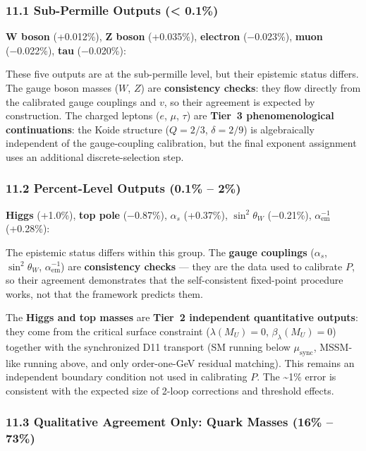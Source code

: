 \subsubsection{11.1 Sub-Permille Outputs (\textless{} 0.1\%)}\label{111-sub-permille-outputs--01}

\textbf{W boson} (+0.012\%), \textbf{Z boson} (+0.035\%), \textbf{electron} (−0.023\%), \textbf{muon} (−0.022\%), \textbf{tau} (−0.020\%):

These five outputs are at the sub-permille level, but their epistemic status differs. The gauge boson masses (\(W\), \(Z\)) are \textbf{consistency checks}: they flow directly from the calibrated gauge couplings and \(v\), so their agreement is expected by construction. The charged leptons (\(e\), \(\mu\), \(\tau\)) are \textbf{Tier~3 phenomenological continuations}: the Koide structure (\(Q = 2/3\), \(\delta = 2/9\)) is algebraically independent of the gauge-coupling calibration, but the final exponent assignment uses an additional discrete-selection step.

\subsubsection{11.2 Percent-Level Outputs (0.1\% -- 2\%)}\label{112-percent-level-outputs-01--2}

\textbf{Higgs} (+1.0\%), \textbf{top pole} (−0.87\%), \textbf{\(\alpha_s\)} (+0.37\%), \textbf{\(\sin^2\theta_W\)} (−0.21\%), \textbf{\(\alpha_{\text{em}}^{-1}\)} (+0.28\%):

The epistemic status differs within this group. The \textbf{gauge couplings} (\(\alpha_s\), \(\sin^2\theta_W\), \(\alpha_{\text{em}}^{-1}\)) are \textbf{consistency checks} --- they are the data used to calibrate \(P\), so their agreement demonstrates that the self-consistent fixed-point procedure works, not that the framework predicts them.

The \textbf{Higgs and top masses} are \textbf{Tier~2 independent quantitative outputs}: they come from the critical surface constraint (\(\lambda(M_U) = 0\), \(\beta_\lambda(M_U) = 0\)) together with the synchronized D11 transport (SM running below \(\mu_{\mathrm{sync}}\), MSSM-like running above, and only order-one-GeV residual matching). This remains an independent boundary condition not used in calibrating \(P\). The \textasciitilde1\% error is consistent with the expected size of 2-loop corrections and threshold effects.

\subsubsection{11.3 Qualitative Agreement Only: Quark Masses (16\% -- 73\%)}\label{113-qualitative-agreement-only-quark-masses-16--73}

